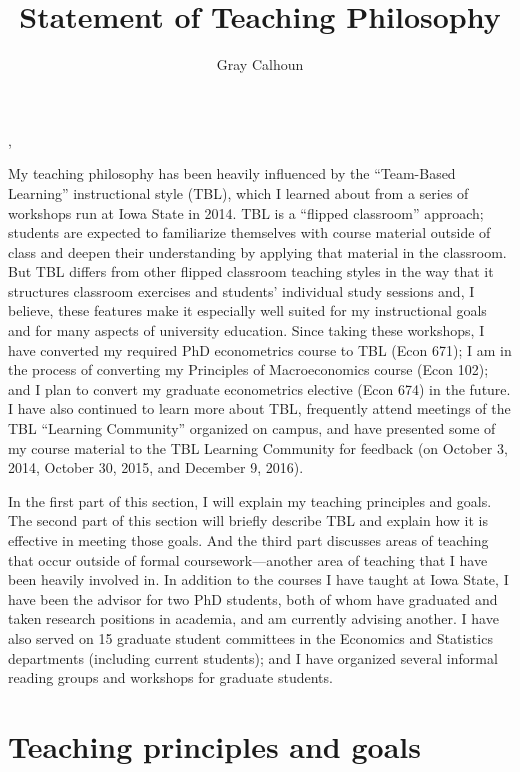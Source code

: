 \documentclass[12pt]{article}%
\author{Gray Calhoun}
\title{Statement of Teaching Philosophy}
\makeatletter
\def\maketitle{%
\begin{center}%
\par{\textls{\MakeUppercase{\textbf{\@title}}}}%
\vspace{\itemsep}%
\par{\@author, \@date}%
\end{center}%
}
\makeatother
\begin{document}
\maketitle

\noindent%
My teaching philosophy has been heavily influenced by the ``Team-Based
Learning'' instructional style (TBL), which I learned about from a
series of workshops run at Iowa State in 2014. TBL is a ``flipped
classroom'' approach; students are expected to familiarize themselves
with course material outside of class and deepen their understanding
by applying that material in the classroom. But TBL differs from other
flipped classroom teaching styles in the way that it structures
classroom exercises and students' individual study sessions and, I
believe, these features make it especially well suited for my
instructional goals and for many aspects of university
education. Since taking these workshops, I have converted my required
PhD econometrics course to TBL (Econ 671); I am in the process of
converting my Principles of Macroeconomics course (Econ 102); and I
plan to convert my graduate econometrics elective (Econ 674) in the
future. I have also continued to learn more about TBL, frequently
attend meetings of the TBL ``Learning Community'' organized on campus,
and have presented some of my course material to the TBL Learning
Community for feedback (on October 3, 2014, October 30, 2015, and
December 9, 2016).

In the first part of this section, I will explain my teaching
principles and goals. The second part of this section will briefly
describe TBL and explain how it is effective in meeting those
goals. And the third part discusses areas of teaching that occur
outside of formal coursework---another area of teaching that I have
been heavily involved in. In addition to the courses I have taught at
Iowa State, I have been the advisor for two PhD students, both of whom
have graduated and taken research positions in academia, and am
currently advising another. I have also served on 15 graduate student
committees in the Economics and Statistics departments (including
current students); and I have organized several informal reading
groups and workshops for graduate students.

\section*{Teaching principles and goals}
\end{document}
